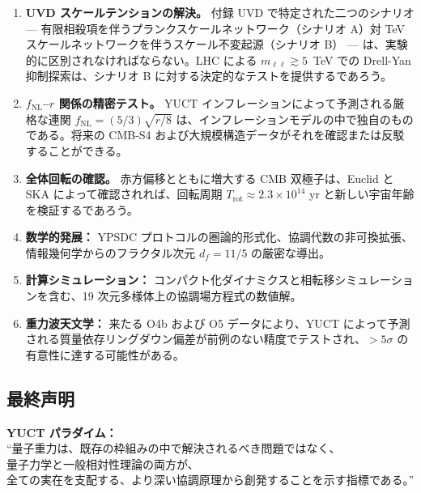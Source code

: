 \documentclass[11pt,a4paper]{article}
\theoremstyle{remark}
\begin{document}
	\begin{enumerate}
		\item \textbf{UVD スケールテンションの解決。} 付録 UVD で特定された二つのシナリオ — 有限相殺項を伴うプランクスケールネットワーク（シナリオ A）対 TeV スケールネットワークを伴うスケール不変起源（シナリオ B） — は、実験的に区別されなければならない。LHC による $m_{\ell\ell}\gtrsim5$~TeV での Drell-Yan 抑制探索は、シナリオ B に対する決定的なテストを提供するであろう。
		
		\item \textbf{$f_{\mathrm{NL}}$–$r$ 関係の精密テスト。} YUCT インフレーションによって予測される厳格な連関 $f_{\mathrm{NL}}=(5/3)\sqrt{r/8}$ は、インフレーションモデルの中で独自のものである。将来の CMB-S4 および大規模構造データがそれを確認または反駁することができる。
		
		\item \textbf{全体回転の確認。} 赤方偏移とともに増大する CMB 双極子は、Euclid と SKA によって確認されれば、回転周期 $T_{\mathrm{rot}}\approx2.3\times10^{14}$ yr と新しい宇宙年齢を検証するであろう。
		
		\item \textbf{数学的発展：} YPSDC プロトコルの圏論的形式化、協調代数の非可換拡張、情報幾何学からのフラクタル次元 $d_f=11/5$ の厳密な導出。
		
		\item \textbf{計算シミュレーション：} コンパクト化ダイナミクスと相転移シミュレーションを含む、19 次元多様体上の協調場方程式の数値解。
		
		\item \textbf{重力波天文学：} 来たる O4b および O5 データにより、YUCT によって予測される質量依存リングダウン偏差が前例のない精度でテストされ、$>5\sigma$ の有意性に達する可能性がある。
	\end{enumerate}
	
	\subsection{最終声明}
	
	\begin{center}
		\textbf{YUCT パラダイム：}\\
		``量子重力は、既存の枠組みの中で解決されるべき問題ではなく、\\
		量子力学と一般相対性理論の両方が、\\
		全ての実在を支配する、より深い協調原理から創発することを示す指標である。''
	\end{center}
	
\end{document}
